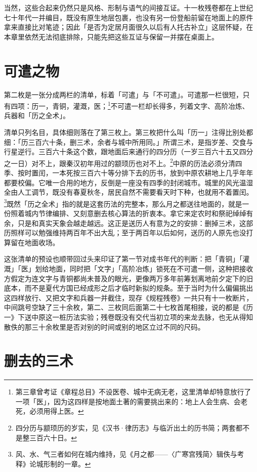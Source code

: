 当然，这些合起来仍然只是风格、形制与语气的间接互证。十一枚残卷都在上世纪七十年代一并编目，既没有原生地层包裹，也没有另一份登船前留在地面上的原件拿来直接比对笔迹；因此「是否为定居月面很久以后有人托古补立」这层怀疑，在本章里依然无法彻底排除，只能先把这些互证与保留一并摆在桌面上。

\section{可遣之物}

第二枚是一张分成两栏的清单，标着「可遣」与「不可遣」。可遣那一栏很短，只有四项：历一，青铜，灌溉，医；\footnote{第三章曾考证《章程总目》不设医卷、城中无病无老，这里清单却特意放行了一项「医」，因为这四样是按地面土著的需要挑出来的：地上人会生病、会老死，必须用得上医。}不可遣一栏却长得多，列着文字、高阶冶炼、兵器和「历之全术」。

清单只列名目，具体细则落在了第三枚上。第三枚把什么叫「历一」注得比别处都细：「历三百六十条，删三术，余者与城中所用同。」所谓三术，是指岁差、交食与行星逆行。三百六十条这个数，跟地面后来通行的四分历（一岁三百六十五又四分之一日）对不上，跟秦汉初年用过的颛顼历也对不上。\footnote{四分历与颛顼历的岁实，见《汉书·律历志》与临沂出土的历书简；两套都不是整三百六十日。}中原的历法必须分清四季、按时置闰，一本死按三百六十等分排下去的历书，放到中原农耕地上几乎年年都要校偏。它唯一合用的地方，反倒是一座没有四季的封闭城市。城里的风光温湿全由人工调节，既没有春夏秋冬，居民自然不需要看天时下种，也就用不着置闰。\footnote{风、水、气三者如何在城内维持，见《月之都——〈广寒宫残简〉辑佚与考释》论城形制的一章。}既然「历之全术」指的就是这套历法的完整本，那么月之都送往地面的，就是一份照着城内节律编排、又刻意删去核心算法的折衷本。拿它来定农时和祭祀绰绰有余，只是和真实天象会越走越远。这正是送历人有意为之的安排：删掉三术，这部历照样可以勉强维持两百年不出大乱；至于两百年以后如何，送历的人原先也没打算留在地面收场。

这张清单的预设也顺带回过头来印证了第一节对成书年代的判断：把「青铜」「灌溉」「医」划给地面，同时把「文字」「高阶冶炼」锁死在不可遣一侧，这种把接收方假定为连文字与青铜都尚未普及的眼光，更像两万多年前筹划离地前夕定下的旧底本，而不是夏代方国已经成形之后才临时新拟的规条。至于当时为什么偏偏挑出这四样放行、又把文字和兵器一并截住，现存《规程残卷》一共只有十一枚断片，中间跳号空缺了三十余枚，第二、三枚同后面第二十七枚首尾相接，说的都是《历一》下送中原这一桩历法实验；残卷既没有交代当初立项的来龙去脉，也无从得知散佚的那三十余枚里是否对别的时间或别的地区立过不同的尺码。

\section{删去的三术}

